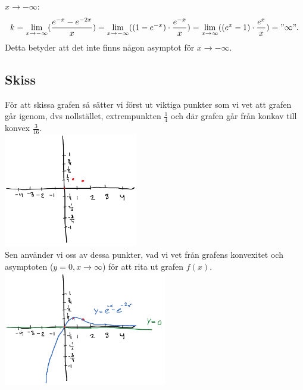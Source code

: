 \documentclass[11pt]{article}
\begin{document}
$x\to-\infty$:
$$k = \lim_{x\to -\infty}(\frac{e^{-x} -e^{-2x}}{x}) = \lim_{x\to -\infty}((1- e^{-x}) \cdot \frac{e^{-x}}{x}) = \lim_{x\to \infty}((e^{x}-1) \cdot \frac{e^{x}}{x}) = "\infty".$$
Detta betyder att det inte finns någon asymptot för $x\to-\infty$.
\newpage
\subsection{Skiss}
För att skissa grafen så sätter vi först ut viktiga punkter som vi vet att grafen går igenom, dvs nollstället, extrempunkten $\frac{1}{4}$ och där grafen går från konkav till konvex $\frac{3}{16}$.\\

\includegraphics[height=5cm]{skiss1}\\
Sen använder vi oss av dessa punkter, vad vi vet från grafens konvexitet och asymptoten ($y=0, x\to\infty$) för att rita ut grafen $f(x)$. \\
\includegraphics[height=5cm]{skiss2}
\end{document}
